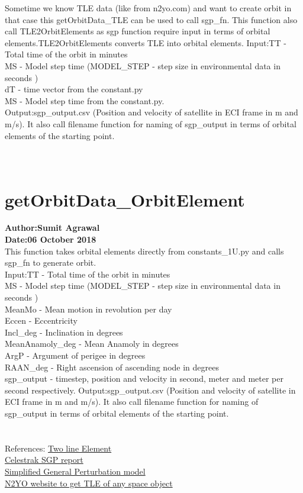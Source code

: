 \documentclass[a4paper, oneside,11pt]{article}
\begin{document}
Sometime we know TLE data (like from n2yo.com) and want to create orbit in that case this getOrbitData\_TLE can be used to call sgp\_fn.
This function also call TLE2OrbitElements as sgp function require input in terms of orbital elements.TLE2OrbitElements converts TLE into orbital elements.
Input:TT - Total time of the orbit in minutes\\
MS - Model step time (MODEL\_STEP - step size in environmental data in seconds
)\\
dT - time vector from the constant.py\\
MS - Model step time from the constant.py.\\ 
Output:sgp\_output.csv (Position and velocity of satellite in ECI frame in m and m/s). It also call filename function for naming of sgp\_output in terms of orbital elements of the starting point.  \\
\\ 
\\
\section*{getOrbitData\_OrbitElement}
\textbf{Author:Sumit Agrawal}\\
\textbf{Date:06 October 2018}\\
 This function takes orbital elements directly from constants\_1U.py and calls sgp\_fn to generate orbit.  \\
Input:TT - Total time of the orbit in minutes\\
MS - Model step time (MODEL\_STEP - step size in environmental data in seconds
)\\
MeanMo - Mean motion in revolution per day\\
Eccen - Eccentricity\\
Incl\_deg - Inclination in degrees \\
MeanAnamoly\_deg - Mean Anamoly in degrees \\
ArgP - Argument of perigee in degrees \\
RAAN\_deg - Right ascension of ascending node in degrees\\
sgp\_output - timestep, position and velocity in second, meter and meter per second respectively. Output:sgp\_output.csv (Position and velocity of satellite in ECI frame in m and m/s). It also call filename function for naming of sgp\_output in terms of orbital elements of the starting point.  \\
\\
\\
References:
\href{https://en.wikipedia.org/wiki/Two-line_element_set}{Two line Element} \\
\href{https://www.celestrak.com/NORAD/documentation/spacetrk.pdf}{Celestrak SGP report}\\
\href{https://en.wikipedia.org/wiki/Simplified_perturbations_models}{Simplified General Perturbation model}\\
\href{https://www.n2yo.com/satellite/?s=41783#results}{N2YO website to get TLE of any space object}
\printbibliography 
\end{document}
